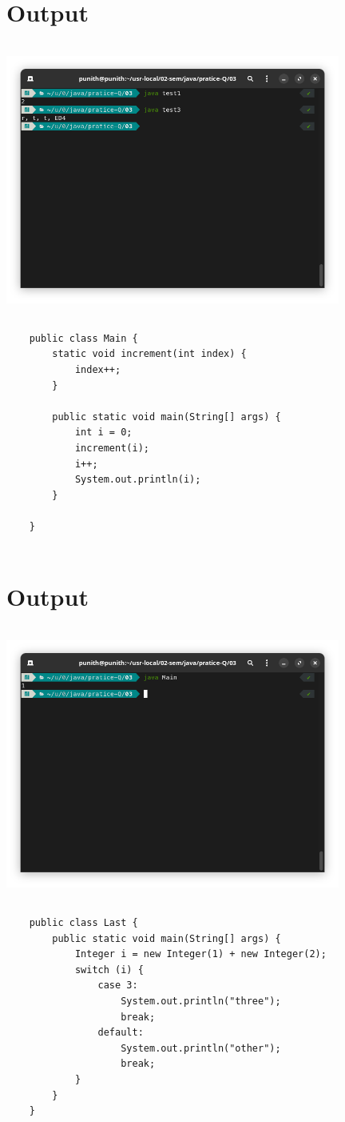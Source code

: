 \documentclass{article}
\begin{document}
 \section*{Output}
\includegraphics[width=11cm, height=9cm]{./images/06.png}
 \begin{lstlisting}
    public class Main {
        static void increment(int index) {
            index++;
        }
    
        public static void main(String[] args) {
            int i = 0;
            increment(i);
            i++;
            System.out.println(i);
        }
    
    }
    
 \end{lstlisting}
 \section*{Output}
 \includegraphics[width=11cm, height=9cm]{./images/07.png}
 \begin{lstlisting}
    public class Last {
        public static void main(String[] args) {
            Integer i = new Integer(1) + new Integer(2);
            switch (i) {
                case 3:
                    System.out.println("three");
                    break;
                default:
                    System.out.println("other");
                    break;
            }
        }
    }
    
 \end{lstlisting}
\end{document}
